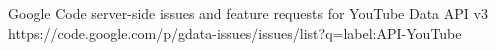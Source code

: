 \begin{thebibliography}{1}
		Google Code server-side issues and feature requests for YouTube Data API v3
		https://code.google.com/p/gdata-issues/issues/list?q=label:API-YouTube
\end{thebibliography}
